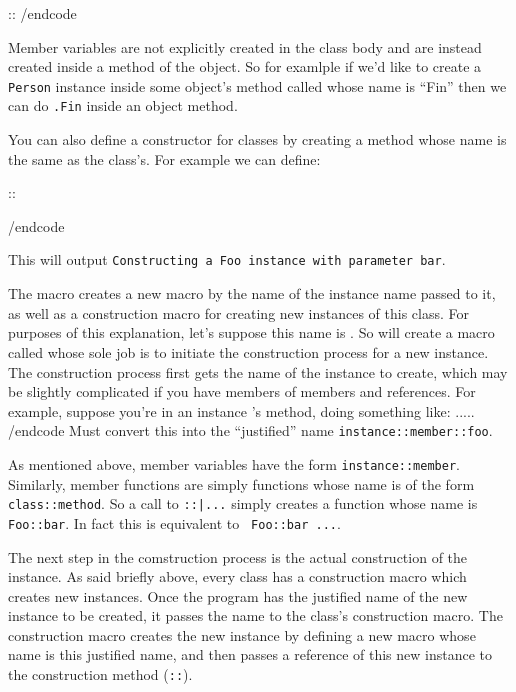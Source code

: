 \begincode
\method\Person::
/endcode

Member variables are not explicitly created in the class body and are instead created inside a method of the object.
So for examlple if we'd like to create a {\tt Person} instance inside some object's method called {\tt\string\person}
whose name is ``Fin'' then we can do {\tt\string\Person\string\self.\string\person\lbrace Fin\rbrace} inside an object
method.

You can also define a constructor for classes by creating a method whose name is the same as the class's.
For example we can define:

\begincode
\class\Foo

\method\Foo::

\Foo{}
/endcode

This will output {\tt Constructing a Foo instance with parameter bar}.

\beginscare
The {\tt\string\class} macro creates a new macro by the name of the instance name passed to it, as well
as a construction macro for creating new instances of this class.
For purposes of this explanation, let's suppose this name is {\tt\string\Foo}.
So {\tt\string\class\string\Foo} will create a macro called {\tt\string\Foo} whose sole job is to initiate
the construction process for a new {\tt\string\Foo} instance.
The construction process first gets the name of the instance to create, which may be slightly complicated
if you have members of members and references.
For example, suppose you're in an instance {\tt\string\instance}'s method, doing something like:
\begincode
\Foo\self.\member.\foo ...
/endcode
Must convert this into the ``justified'' name {\tt instance::member::foo}.

As mentioned above, member variables have the form {\tt instance::member}.
Similarly, member functions are simply functions whose name is of the form {\tt class::method}.
So a call to {\tt\string\method\string\Foo::\string\bar ...} simply creates a function whose name is
{\tt Foo::bar}.
In fact this is equivalent to
{\tt\string\expandafter\string\function\string\csname\ Foo::bar\string\endcsname\ ...}.

The next step in the comstruction process is the actual construction of the instance.
As said briefly above, every class has a construction macro which creates new instances.
Once the program has the justified name of the new instance to be created, it passes the name to the class's
construction macro.
The construction macro creates the new instance by defining a new macro whose name is this justified name,
and then passes a reference of this new instance to the construction method ({\tt\string\Foo::\string\Foo}).

